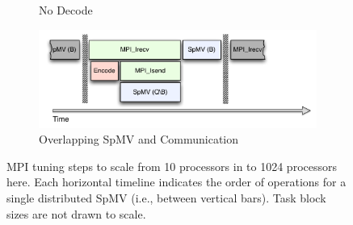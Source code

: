 \documentclass{report}
\begin{document}
\begin{figure}
\begin{subfigure}{0.48\textwidth}
\caption{No Decode}
\label{fig:no_decode_cpu}
\end{subfigure}
\begin{subfigure}{0.48\textwidth}
\centering
\includegraphics[width=\textwidth]{../figures/omnigraffle/OverlapCPU.pdf}
\caption{Overlapping SpMV and Communication}
\label{fig:overlap_cpu}
\end{subfigure}
\caption{MPI tuning steps to scale from 10 processors in \cite{BolligFlyerErlebacher2012} to 1024 processors here. Each horizontal timeline indicates the order of operations for a single distributed SpMV (i.e., between vertical bars). Task block sizes are not drawn to scale. } 
\label{fig:mpi_tuning}
\end{figure}
\end{document}
